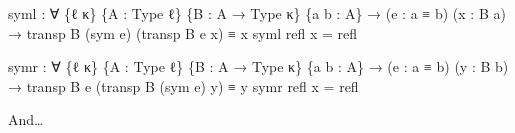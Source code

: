 \documentclass[
  11pt,
  oneside,
  article]{memoir}
\newenvironment{Shaded}{}{}
\newcommand{\NormalTok}[1]{#1}
\newcommand{\OtherTok}[1]{\textcolor[rgb]{0.00,0.44,0.13}{#1}}
\theoremstyle{definition}
\theoremstyle{plain}
\newcommand{\0}{\textsf{0}}
\newcommand{\1}{\tn{\textsf{1}}}
\begin{document}
\begin{Shaded}
\begin{Highlighting}[]
\NormalTok{syml }\OtherTok{:} \OtherTok{∀} \OtherTok{\{}\NormalTok{ℓ κ}\OtherTok{\}} \OtherTok{\{}\NormalTok{A }\OtherTok{:}\NormalTok{ Type ℓ}\OtherTok{\}} \OtherTok{\{}\NormalTok{B }\OtherTok{:}\NormalTok{ A }\OtherTok{→}\NormalTok{ Type κ}\OtherTok{\}} \OtherTok{\{}\NormalTok{a b }\OtherTok{:}\NormalTok{ A}\OtherTok{\}}
       \OtherTok{→} \OtherTok{(}\NormalTok{e }\OtherTok{:}\NormalTok{ a ≡ b}\OtherTok{)} \OtherTok{(}\NormalTok{x }\OtherTok{:}\NormalTok{ B a}\OtherTok{)} \OtherTok{→}\NormalTok{ transp B }\OtherTok{(}\NormalTok{sym e}\OtherTok{)} \OtherTok{(}\NormalTok{transp B e x}\OtherTok{)}\NormalTok{ ≡ x}
\NormalTok{syml refl x }\OtherTok{=}\NormalTok{ refl}

\NormalTok{symr }\OtherTok{:} \OtherTok{∀} \OtherTok{\{}\NormalTok{ℓ κ}\OtherTok{\}} \OtherTok{\{}\NormalTok{A }\OtherTok{:}\NormalTok{ Type ℓ}\OtherTok{\}} \OtherTok{\{}\NormalTok{B }\OtherTok{:}\NormalTok{ A }\OtherTok{→}\NormalTok{ Type κ}\OtherTok{\}} \OtherTok{\{}\NormalTok{a b }\OtherTok{:}\NormalTok{ A}\OtherTok{\}}
       \OtherTok{→} \OtherTok{(}\NormalTok{e }\OtherTok{:}\NormalTok{ a ≡ b}\OtherTok{)} \OtherTok{(}\NormalTok{y }\OtherTok{:}\NormalTok{ B b}\OtherTok{)} \OtherTok{→}\NormalTok{ transp B e }\OtherTok{(}\NormalTok{transp B }\OtherTok{(}\NormalTok{sym e}\OtherTok{)}\NormalTok{ y}\OtherTok{)}\NormalTok{ ≡ y}
\NormalTok{symr refl x }\OtherTok{=}\NormalTok{ refl}
\end{Highlighting}
\end{Shaded}

And\ldots{}
\end{document}
